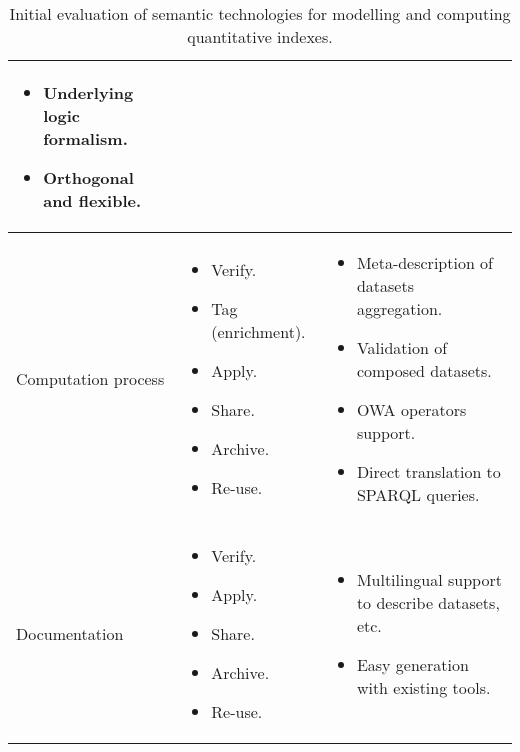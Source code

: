 \begin{table}[!htb]
\begin{center}
\begin{tabular}{|p{3cm}|p{3.5cm}|p{6.5cm}|}
\begin{itemize}
                  \item Underlying logic formalism.                  
                  \item Orthogonal and flexible.                 
                 \end{itemize} \\ \hline  
  Computation process &  \begin{itemize} \item Verify. \item Tag (enrichment). \item Apply. \item Share. \item Archive. \item Re-use. \end{itemize} & \begin{itemize}
                  \item Meta-description of datasets aggregation.
                  \item Validation of composed datasets.
                  \item OWA operators support.
                  \item Direct translation to SPARQL queries.  
                 \end{itemize} \\ \hline
  Documentation & \begin{itemize} \item Verify. \item Apply. \item Share. \item Archive. \item Re-use. \end{itemize} &\begin{itemize}
                  \item Multilingual support to describe datasets, etc.
                  \item Easy generation with existing tools.                
                 \end{itemize} \\ \hline               
       
  \hline
  \end{tabular}
  \caption{Initial evaluation of semantic technologies for modelling and computing quantitative indexes.}
  \label{tab:eval-rdfindex}
  \end{center}
\end{table} 



